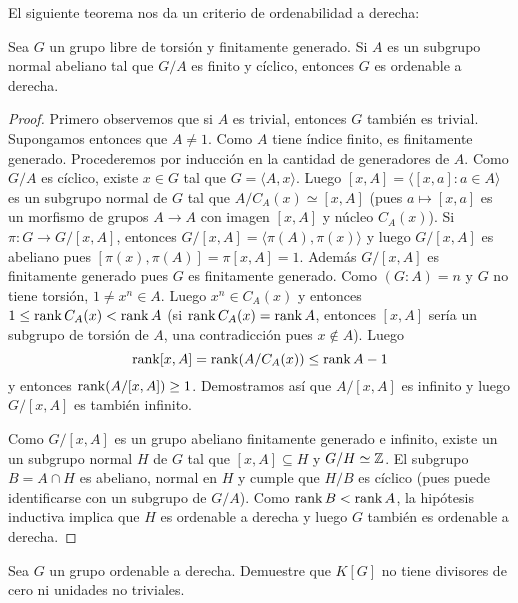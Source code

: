 El siguiente teorema nos da un criterio de ordenabilidad a derecha:

\begin{theorem}
	Sea $G$ un grupo libre de torsión y finitamente generado. Si $A$ es un
	subgrupo normal abeliano tal que $G/A$ es finito y cíclico, entonces $G$ es
	ordenable a derecha.
\end{theorem}

\begin{proof}
	Primero observemos que si $A$ es trivial, entonces $G$ también es trivial.
Supongamos entonces que $A\ne 1$.  Como $A$ tiene índice finito, es finitamente
generado. Procederemos por inducción en la cantidad de generadores de $A$. Como
$G/A$ es cíclico, existe $x\in G$ tal que $G=\langle A,x\rangle$. Luego
$[x,A]=\langle [x,a]:a\in A\rangle$ es un subgrupo normal de $G$ tal que
$A/C_A(x)\simeq [x,A]$ (pues $a\mapsto [x,a]$ es un morfismo de grupos $A\to A$
con imagen $[x,A]$ y núcleo $C_A(x)$). Si $\pi\colon G\to G/[x,A]$, entonces
$G/[x,A]=\langle \pi(A),\pi(x)\rangle$ y luego $G/[x,A]$ es abeliano pues
$[\pi(x),\pi(A)]=\pi[x,A]=1$. Además $G/[x,A]$ es finitamente generado pues $G$
es finitamente generado. Como $(G:A)=n$ y $G$ no tiene torsión, $1\ne x^n\in
A$.  Luego $x^n\in C_A(x)$ y entonces $1\leq \operatorname{rank} C_A(x)<\operatorname{rank} A$ (si $\operatorname{rank}
C_A(x)=\operatorname{rank} A$, entonces $[x,A]$ sería un subgrupo de torsión de $A$, una
contradicción pues $x\not\in A$).  Luego 
\[
\operatorname{rank}[x,A]=\operatorname{rank} (A/C_A(x))\leq\operatorname{rank} A-1
\]
y entonces $\operatorname{rank} (A/[x,A])\geq 1$. Demostramos así que $A/[x,A]$ es infinito y
luego $G/[x,A]$ es también infinito. 

Como $G/[x,A]$ es un grupo abeliano finitamente generado e infinito, existe un
un subgrupo normal $H$ de $G$ tal que $[x,A]\subseteq H$ y $G/H\simeq\mathbb{Z}$. El
subgrupo $B=A\cap H$ es abeliano, normal en $H$ y cumple que $H/B$ es cíclico
(pues puede identificarse con un subgrupo de $G/A$). Como $\operatorname{rank} B<\operatorname{rank} A$, la
hipótesis inductiva implica que $H$ es ordenable a derecha y luego $G$ también
es ordenable a derecha.
\end{proof}

\begin{exercise}
	Sea $G$ un grupo ordenable a derecha. Demuestre que $K[G]$ no tiene divisores de
	cero ni unidades no triviales.	
\end{exercise}

